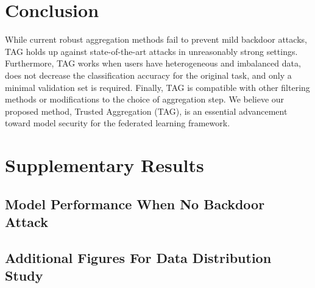 \documentclass{article} %
\begin{document}
% 
\section{Conclusion}

While current robust aggregation methods fail to prevent mild backdoor attacks, TAG holds up against state-of-the-art attacks in unreasonably strong settings. Furthermore, TAG works when users have heterogeneous and imbalanced data, does not decrease the classification accuracy for the original task, and only a minimal validation set is required. Finally, TAG is compatible with other filtering methods or modifications to the choice of aggregation step. We believe our proposed method, Trusted Aggregation (TAG), is an essential advancement toward model security for the federated learning framework.

\newpage
{  \small 


}


%
\pagebreak\appendix

\section{Supplementary Results}

%
\subsection{Model Performance When No Backdoor Attack}

%
\subsection{Additional Figures For Data Distribution Study}
\end{document}
